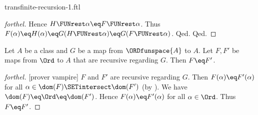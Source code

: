 \documentclass{naproche-library}
\begin{document}
\begin{smodule}[title=Transfinite Recursion I]{transfinite-recursion-1.ftl}
\begin{proof}[forthel]
      Hence $H \FUNrest \alpha \eq F \FUNrest \alpha$.
      Thus $F(\alpha)
        \eq H(\alpha)
        \eq G(H \FUNrest \alpha)
        \eq G(F \FUNrest \alpha)$.
    Qed.
  Qed.
\end{proof}

\begin{theorem}[forthel,title=Transfinite Recursion Theorem: Uniqueness,id=transfinite-recursion_uniqueness]
  Let $A$ be a class and $G$ be a map from $\ORDfunspace{A}$ to $A$.
  Let $F, F'$ be maps from $\Ord$ to $A$ that are recursive regarding $G$.
  Then $F \eq F'$.
\end{theorem}
\begin{proof}[forthel]
  [prover vampire]
  $F$ and $F'$ are recursive regarding $G$.
  Then $F(\alpha) \eq F'(\alpha)$ for all $\alpha \in \dom(F) \SETintersect \dom(F')$ (by ).
  We have $\dom(F) \eq \Ord \eq \dom(F')$.
  Hence $F(\alpha) \eq F'(\alpha)$ for all $\alpha \in \Ord$.
  Thus $F \eq F'$.
\end{proof}
\end{smodule}
\end{document}
